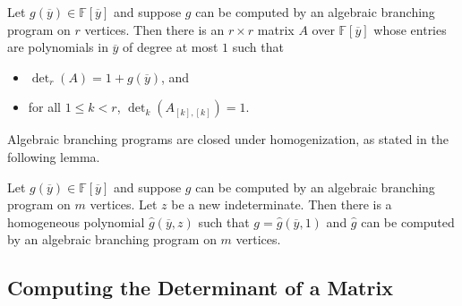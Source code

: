 \documentclass[10pt,a4paper]{amsart}
\newcommand*\F{\mathbb{F}}
\begin{document}
\begin{lem}\label{lem:ABP_to_det}
  Let $g(\overline{y}) \in \F[\overline{y}]$ and suppose $g$ can be computed by an algebraic branching program on $r$ vertices.
  Then there is an $r \times r$ matrix $A$ over $\F[\overline{y}]$ whose entries are polynomials in $\overline{y}$ of degree at most $1$ such that
  \begin{itemize}
    \item $\det_r(A) = 1 + g(\overline{y})$, and
    \item for all $1 \leq k < r$, $\det_k(A_{[k], [k]}) = 1$.
  \end{itemize}
\end{lem}

Algebraic branching programs are closed under homogenization, as stated in the following lemma.

\begin{lem}[{\cite[Lemma 3.7]{AF21}}]\label{lem:homog_ABP}
  Let $g(\overline{y}) \in \F[\overline{y}]$ and suppose $g$ can be computed by an algebraic branching program on $m$ vertices.
  Let $z$ be a new indeterminate.
  Then there is a homogeneous polynomial $\widehat{g}(\overline{y}, z)$ such that $g = \widehat{g}(\overline{y}, 1)$ and $\widehat{g}$ can be computed by an algebraic branching program on $m$ vertices.
\end{lem}

\subsection{Computing the Determinant of a Matrix} 
\end{document}
